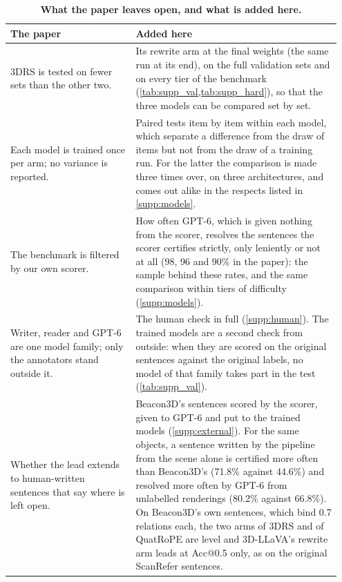 \begin{table}[!ht]
\centering
\small
\caption{\textbf{What the paper leaves open, and what is added here.}}
\label{tab:supp_map}
\begin{tabular}{@{}p{0.36\linewidth}p{0.59\linewidth}@{}}
\toprule
The paper & Added here \\
\midrule
3DRS is tested on fewer sets than the other two. & Its rewrite arm at the final weights (the same run at its end), on the full validation sets and on every tier of the benchmark (\cref{tab:supp_val,tab:supp_hard}), so that the three models can be compared set by set. \\
\addlinespace
Each model is trained once per arm; no variance is reported. & Paired tests item by item within each model, which separate a difference from the draw of items but not from the draw of a training run. For the latter the comparison is made three times over, on three architectures, and comes out alike in the respects listed in \cref{supp:models}. \\
\addlinespace
The benchmark is filtered by our own scorer. & How often GPT-6, which is given nothing from the scorer, resolves the sentences the scorer certifies strictly, only leniently or not at all (98, 96 and 90\% in the paper): the sample behind these rates, and the same comparison within tiers of difficulty (\cref{supp:models}). \\
\addlinespace
Writer, reader and GPT-6 are one model family; only the annotators stand outside it. & The human check in full (\cref{supp:human}). The trained models are a second check from outside: when they are scored on the original sentences against the original labels, no model of that family takes part in the test (\cref{tab:supp_val}). \\
\addlinespace
Whether the lead extends to human-written sentences that say where is left open. & Beacon3D's sentences scored by the scorer, given to GPT-6 and put to the trained models (\cref{supp:external}). For the same objects, a sentence written by the pipeline from the scene alone is certified more often than Beacon3D's (71.8\% against 44.6\%) and resolved more often by GPT-6 from unlabelled renderings (80.2\% against 66.8\%). On Beacon3D's own sentences, which bind 0.7 relations each, the two arms of 3DRS and of QuatRoPE are level and 3D-LLaVA's rewrite arm leads at Acc@0.5 only, as on the original ScanRefer sentences. \\
\bottomrule
\end{tabular}
\end{table}

